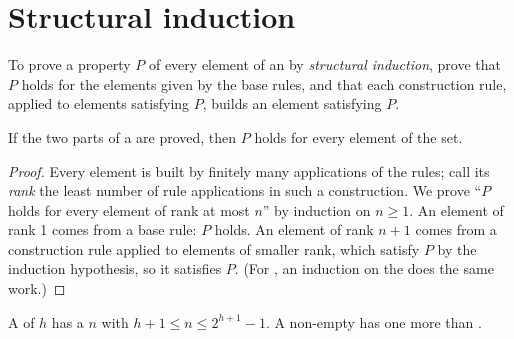 \section{Structural induction}\label{sec:b1:induction-and-termination:structural}

\begin{definition}\label{def:b1:induction-and-termination:structural}
To prove a property $P$ of every element of an  by \emph{structural
induction}, prove that $P$ holds for the elements given by the base rules, and that each
construction rule, applied to elements satisfying $P$, builds an element satisfying $P$.
\end{definition}

\begin{proposition}\label{prop:b1:induction-and-termination:structural}
If the two parts of a  are proved, then $P$ holds for every element of the set.
\end{proposition}

\begin{proof}
Every element is built by finitely many applications of the rules; call its \emph{rank} the least number of rule
applications in such a construction. We prove ``$P$ holds for every element of rank at most $n$'' by induction on
$n \geq 1$. An element of rank 1 comes from a base rule: $P$ holds. An element of rank $n + 1$ comes from a
construction rule applied to elements of smaller rank, which satisfy $P$ by the induction hypothesis, so it satisfies
$P$. (For , an induction on the  does the same work.)
\end{proof}

\begin{proposition}\label{prop:b1:induction-and-termination:bounds}
A  of  $h$ has a  $n$ with $h + 1 \leq n \leq 2^{h + 1} - 1$. A  non-empty  has one
more  than .
\end{proposition}

